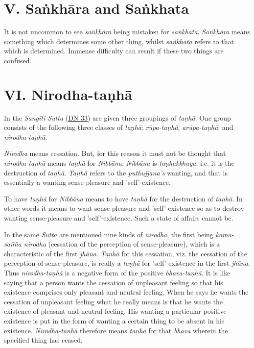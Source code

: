 \hypertarget{x-v.-saṅkhāra-and-saṅkhata}{\section*{V. Saṅkhāra and Saṅkhata}}
It is not uncommon to see \emph{saṅkhāra} being mistaken for \emph{saṅkhata}. \emph{Saṅkhāra}
means something which determines some other thing, whilst \emph{saṅkhata}
refers to that which is determined. Immense difficulty can result if
these two things are confused.


\hypertarget{x-vi.-nirodha-taṇhā}{\section*{VI. Nirodha-taṇhā}}
In the \emph{Sangīti Sutta} (\href{https://suttacentral.net/dn33/en/sujato}{DN 33}) are given three groupings of
\emph{taṇhā}. One group consists of the following three classes of \emph{taṇhā}:
\emph{rūpa-taṇhā}, \emph{arūpa-taṇhā}, and \emph{nirodha-taṇhā}.


\emph{Nirodha} means cessation.
But, for this reason it must not be thought that \emph{nirodha-taṇhā} means
\emph{taṇhā} for \emph{Nibbāna}. \emph{Nibbāna} is \emph{taṇhakkhaya}, i.e. it is the destruction of
\emph{taṇhā}. \emph{Taṇhā} refers to the \emph{puthujjana’s} wanting, and that is essentially
a wanting sense-pleasure and 'self'-existence.


To have \emph{taṇhā} for \emph{Nibbāna} means to have \emph{taṇhā} for the destruction of
\emph{taṇhā}. In other words it means to want sense-pleasure and
'self'-existence so as to destroy wanting sense-pleasure and
'self'-existence. Such a state of affairs cannot be.


In the same \emph{Sutta} are mentioned nine kinds of \emph{nirodha}, the first being
\emph{kāma-sañña nirodha} (cessation of the perception of sense-pleasure),
which is a characteristic of the first \emph{jhāna}. \emph{Taṇhā} for this cessation,
viz. the cessation of the perception of sense-pleasure, is really a
\emph{taṇhā} for 'self'-existence in the first \emph{jhāna}. Thus \emph{nirodha-taṇhā} is a
negative form of the positive \emph{bhava-taṇhā}. It is like saying that a
person wants the cessation of unpleasant feeling so that his existence
comprises only pleasant and neutral feeling. When he says he wants the
cessation of unpleasant feeling what he really means is that he wants
the existence of pleasant and neutral feeling. His wanting a particular
positive existence is put in the form of wanting a certain thing to be
absent in his existence. \emph{Nirodha-taṇhā} therefore means \emph{taṇhā} for that
\emph{bhava} wherein the specified thing has ceased.


